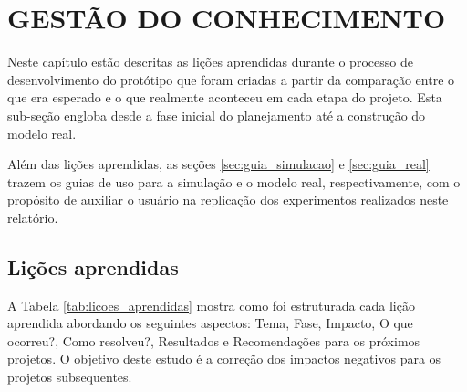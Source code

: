\chapter{GESTÃO DO CONHECIMENTO}
\label{chap:conhec}

Neste capítulo estão descritas as lições aprendidas durante o processo de desenvolvimento do protótipo que foram criadas a partir da comparação entre o que era esperado e o que realmente aconteceu em cada etapa do projeto. Esta sub-seção engloba desde a fase inicial do planejamento até a construção do modelo real.

Além das lições aprendidas, as seções \ref{sec:guia_simulacao} e \ref{sec:guia_real} trazem os guias de uso para a simulação e o modelo real, respectivamente, com o propósito de auxiliar o usuário na replicação dos experimentos realizados neste relatório.

\section{Lições aprendidas}
\label{sec:licap}

A Tabela \ref{tab:licoes_aprendidas}  mostra como foi estruturada cada lição aprendida abordando os seguintes aspectos: Tema, Fase, Impacto, O que ocorreu?, Como resolveu?, Resultados e Recomendações para os próximos projetos. O objetivo deste estudo é a correção dos impactos negativos para os projetos subsequentes.


